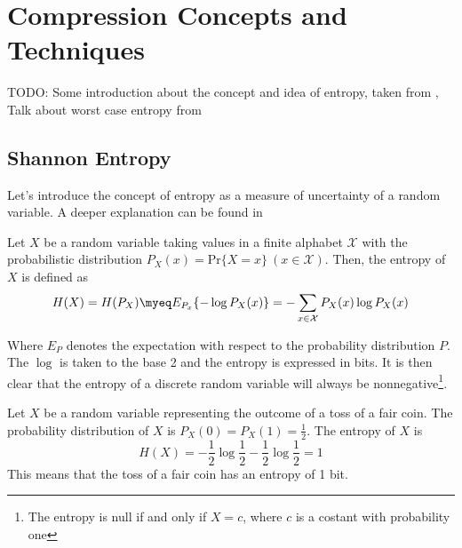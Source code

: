 
\chapter{Compression Concepts and Techniques} %

\label{ch:Chapter2} %

TODO: Some introduction about the concept and idea of entropy, taken from \cite{Shannon1948,navarro2016compact,han2002mathematics}, Talk about worst case entropy from \cite{navarro2016compact}

\section{Shannon Entropy} \label{sec:shannon_entropy}

Let's introduce the concept of entropy as a measure of uncertainty of a random variable. A deeper explanation can be found in \cite{han2002mathematics,navarro2016compact,ElementsofInformationTheory}

\begin{definition}\label{def:entropy}
    Let $X$ be a random variable taking values in a finite alphabet $\mathcal{X}$ with the probabilistic distribution $P_X(x)= \text{Pr}\{X=x\}~(x\in\mathcal{X})$. Then, the entropy of $X$ is defined as
    \begin{equation}
        H(X) = H(P_X) \myeq E_{P_x} \{-\log P_X(x)\} = -\sum_{x\in\mathcal{X}} P_X(x)\log P_X(x)
    \end{equation}
\end{definition}
Where $E_P$ denotes the expectation with respect to the probability distribution $P$. The $\log$ is taken to the base 2 and the entropy is expressed in bits. It is then clear that the entropy of a discrete random variable will always be nonnegative\footnote{The entropy is null if and only if $X = c$, where $c$ is a costant with probability one}.

\begin{example}
    Let $X$ be a random variable representing the outcome of a toss of a fair coin. The probability distribution of $X$ is $P_X(0) = P_X(1) = \frac{1}{2}$. The entropy of $X$ is
    \begin{equation}
        H(X) = -\frac{1}{2}\log\frac{1}{2} - \frac{1}{2}\log\frac{1}{2} = 1
    \end{equation}
    This means that the toss of a fair coin has an entropy of 1 bit.
\end{example}

